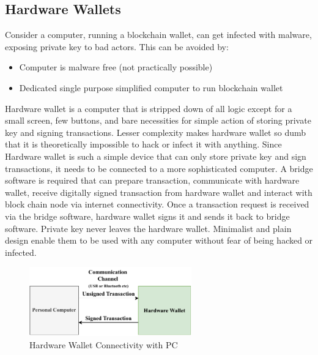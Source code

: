 \documentclass[conference]{IEEEtran}
\begin{document}

\subsection{Hardware Wallets}
Consider a computer, running a blockchain wallet, can get infected with malware, exposing private key to bad actors. This can be avoided by:
\begin{itemize}
    \item Computer is malware free (not practically possible)
    \item Dedicated single purpose simplified computer to run blockchain wallet
\end{itemize}
Hardware wallet is a computer that is stripped down of all logic except for a small screen, few buttons, and bare necessities for simple 
action of storing private key and signing transactions. Lesser complexity makes hardware wallet so dumb that it is theoretically impossible 
to hack or infect it with anything. Since Hardware wallet is such a simple device that can only store private key and sign transactions, 
it needs to be connected to a more sophisticated computer. A bridge software is required that can prepare transaction, communicate with 
hardware wallet, receive digitally signed transaction from hardware wallet and interact with block chain node via internet connectivity. 
Once a transaction request is received via the bridge software, hardware wallet signs it and sends it back to bridge software. Private key 
never leaves the hardware wallet. Minimalist and plain design enable them to be used with any computer without fear of being hacked or 
infected\cite{suratkar2020cryptocurrency}.  
\begin{figure}[t]
    \centering
    \includegraphics[width=70mm]{Figures/BD.pdf}
    \caption{Hardware Wallet Connectivity with PC}
    \label{fig1}
\end{figure}

\end{document}

